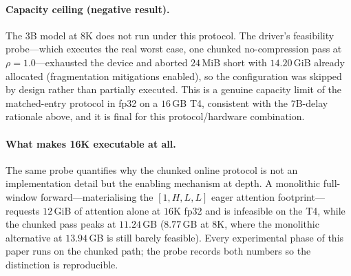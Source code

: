 \paragraph{Capacity ceiling (negative result).}
The 3B model at $8$K does not run under this protocol. The driver's
feasibility probe---which executes the real worst case, one chunked
no-compression pass at $\rho=1.0$---exhausted the device and aborted
$24$\,MiB short with $14.20$\,GiB already allocated (fragmentation
mitigations enabled), so the configuration was skipped by design rather
than partially executed. This is a genuine capacity limit of the
matched-entry protocol in fp32 on a $16$\,GB T4, consistent with the
$7$B-delay rationale above, and it is final for this
protocol/hardware combination.

\paragraph{What makes 16K executable at all.}
The same probe quantifies why the chunked online protocol is not an
implementation detail but the enabling mechanism at depth. A monolithic
full-window forward---materialising the $[1,H,L,L]$ eager attention
footprint---requests $12$\,GiB of attention alone at $16$K fp32 and is
infeasible on the T4, while the chunked pass peaks at $11.24$\,GB
($8.77$\,GB at $8$K, where the monolithic alternative at $13.94$\,GB is
still barely feasible). Every experimental phase of this paper runs on
the chunked path; the probe records both numbers so the distinction is
reproducible.

